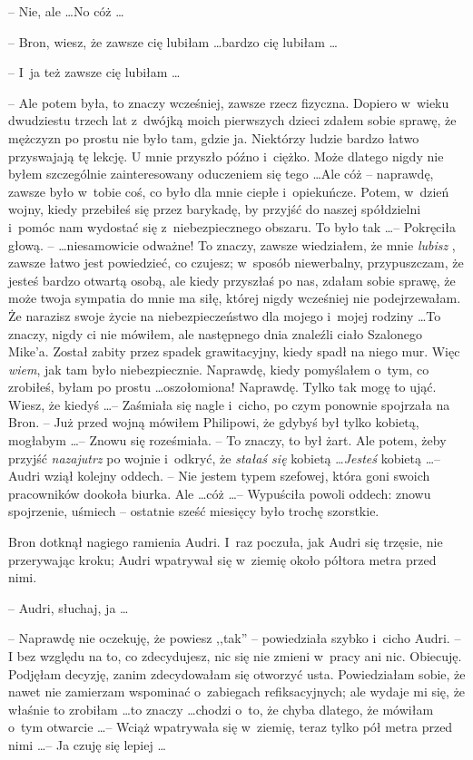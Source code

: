 \documentclass[oneside,polish,11pt,rmheadings]{mwbk}
\begin{document}
-- Nie, ale \ldots  No cóż \ldots      

-- Bron, wiesz, że zawsze cię lubiłam \ldots  bardzo cię lubiłam \ldots   

-- I~ja też zawsze cię lubiłam \ldots   

-- Ale potem była, to znaczy wcześniej, zawsze rzecz fizyczna. Dopiero w~wieku dwudziestu trzech lat z~dwójką moich pierwszych dzieci zdałem sobie sprawę, że mężczyzn po prostu nie było tam, gdzie ja. Niektórzy ludzie bardzo łatwo przyswajają tę lekcję. U mnie przyszło późno i~ciężko. Może dlatego nigdy nie byłem szczególnie zainteresowany oduczeniem się tego \ldots   Ale cóż -- naprawdę, zawsze było w~tobie coś, co było dla mnie ciepłe i~opiekuńcze. Potem, w~dzień wojny, kiedy przebiłeś się przez barykadę, by przyjść do naszej spółdzielni i~pomóc nam wydostać się z~niebezpiecznego obszaru. To było tak \ldots  -- Pokręciła głową. -- \ldots niesamowicie odważne! To znaczy, zawsze wiedziałem, że mnie \textit{lubisz }, zawsze łatwo jest powiedzieć, co czujesz; w~sposób niewerbalny, przypuszczam, że jesteś bardzo otwartą osobą, ale kiedy przyszłaś po nas, zdałam sobie sprawę, że może twoja sympatia do mnie ma siłę, której nigdy wcześniej nie podejrzewałam. Że narazisz swoje życie na niebezpieczeństwo dla mojego i~mojej rodziny \ldots  To znaczy, nigdy ci nie mówiłem, ale następnego dnia znaleźli ciało Szalonego Mike'a. Został zabity przez spadek grawitacyjny, kiedy spadł na niego mur. Więc \textit{wiem}, jak tam było niebezpiecznie. Naprawdę, kiedy pomyślałem o~tym, co zrobiłeś, byłam po prostu \ldots  oszołomiona! Naprawdę. Tylko tak mogę to ująć. Wiesz, że kiedyś \ldots  -- Zaśmiała się nagle i~cicho, po czym ponownie spojrzała na Bron. -- Już przed wojną mówiłem Philipowi, że gdybyś był tylko kobietą, mogłabym \ldots -- Znowu się roześmiała. -- To znaczy, to był żart.  Ale potem, żeby przyjść \textit{nazajutrz }po wojnie i~odkryć, że \textit{stałaś się }kobietą  \ldots   \textit{Jesteś }kobietą  \ldots  -- Audri wziął kolejny oddech. -- Nie jestem typem szefowej, która goni swoich pracowników dookoła biurka. Ale \ldots  cóż \ldots  -- Wypuściła powoli oddech: znowu spojrzenie, uśmiech -- ostatnie sześć miesięcy było trochę szorstkie. 

Bron dotknął nagiego ramienia Audri. I~raz poczuła, jak Audri się trzęsie, nie przerywając kroku; Audri wpatrywał się w~ziemię około półtora metra przed nimi. 

-- Audri, słuchaj, ja \ldots  

-- Naprawdę nie oczekuję, że powiesz ,,tak'' -- powiedziała szybko i~cicho Audri. -- I bez względu na to, co zdecydujesz, nic się nie zmieni w~pracy ani nic. Obiecuję. Podjęłam decyzję, zanim zdecydowałam się otworzyć usta. Powiedziałam sobie, że nawet nie zamierzam wspominać o~zabiegach refiksacyjnych; ale wydaje mi się, że właśnie to zrobiłam \ldots   to znaczy \ldots  chodzi o~to, że chyba dlatego, że mówiłam o~tym otwarcie \ldots  -- Wciąż wpatrywała się w~ziemię, teraz tylko pół metra przed nimi \ldots  -- Ja czuję się lepiej \ldots  
\end{document}
